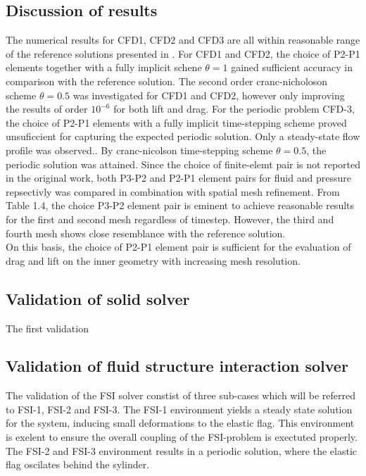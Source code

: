 \subsection{Discussion of results}
The numerical results for CFD1, CFD2 and CFD3 are all within reasonable range of the reference solutions presented in \cite{Hron2006}. 
For CFD1 and CFD2, the choice of P2-P1 elements together with a fully implicit schene $\theta = 1$ gained sufficient accuracy in comparison with the reference solution. The second order cranc-nicholoson scheme  $\theta = 0.5$ was investigated for CFD1 and CFD2, however only improving the results of order $10^{-6}$ for both lift and drag. For the periodic problem CFD-3, the choice of  P2-P1 elements with a fully implicit time-stepping scheme proved unsuficcient for capturing the expected periodic solution. Only a steady-state flow profile was observed.. By cranc-nicolson time-stepping scheme $\theta = 0.5$, the periodic solution was attained. Since the choice of finite-elemt pair is not reported in the original work, both P3-P2 and P2-P1 element pairs for fluid and pressure repsectivly was compared in combination with spatial mesh refinement. From Table 1.4, the choice P3-P2 element pair is eminent to achieve reasonable results for the first and second mesh regardless of timestep.  However, the third and fourth mesh shows close resemblance with the reference solution. \\
On this basis, the choice of P2-P1 element pair is sufficient for the evaluation of drag and lift on the inner geometry with increasing mesh resolution. 

\newpage
\subsection{Validation of solid solver}
The first validation



\newpage
\subsection{Validation of fluid structure interaction solver}
The validation of the FSI solver constist of three sub-cases which will be referred to FSI-1, FSI-2 and FSI-3. The FSI-1 environment yields a steady state solution for the system, inducing small deformations to the elastic flag. This environment is exelent to ensure the overall coupling of the FSI-problem is exectuted properly. The FSI-2 and FSI-3 environment results in a periodic solution, where the elastic flag oscilates behind the sylinder.


